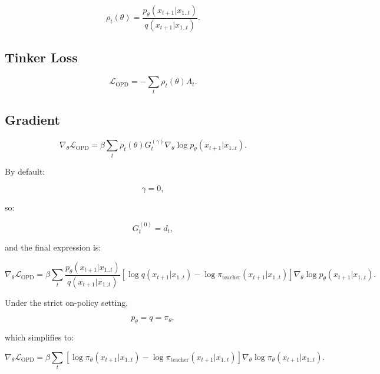 \documentclass[11pt,a4paper]{article}
\begin{document}
\[
\boxed{
\rho_t(\theta)
=
\frac{
p_\theta(x_{t+1}|x_{1..t})
}{
q(x_{t+1}|x_{1..t})
}.
}
\]

\subsection{Tinker Loss}

\[
\boxed{
\mathcal L_{\mathrm{OPD}}
=
-\sum_t\rho_t(\theta)A_t.
}
\]

\subsection{Gradient}

\[
\boxed{
\nabla_\theta\mathcal L_{\mathrm{OPD}}
=
\beta\sum_t
\rho_t(\theta)G_t^{(\gamma)}
\nabla_\theta\log p_\theta(x_{t+1}|x_{1..t}).
}
\]

By default:

\[
\gamma=0,
\]

so:

\[
G_t^{(0)}=d_t,
\]

and the final expression is:

\[
\boxed{
\nabla_\theta\mathcal L_{\mathrm{OPD}}
=
\beta\sum_t
\frac{p_\theta(x_{t+1}|x_{1..t})}
{q(x_{t+1}|x_{1..t})}
\left[
\log q(x_{t+1}|x_{1..t})
-
\log\pi_{\text{teacher}}(x_{t+1}|x_{1..t})
\right]
\nabla_\theta\log p_\theta(x_{t+1}|x_{1..t}).
}
\]

Under the strict on-policy setting,

\[
p_\theta=q=\pi_\theta,
\]

which simplifies to:

\[
\boxed{
\nabla_\theta\mathcal L_{\mathrm{OPD}}
=
\beta\sum_t
\left[
\log\pi_\theta(x_{t+1}|x_{1..t})
-
\log\pi_{\text{teacher}}(x_{t+1}|x_{1..t})
\right]
\nabla_\theta\log\pi_\theta(x_{t+1}|x_{1..t}).
}
\]
\end{document}
